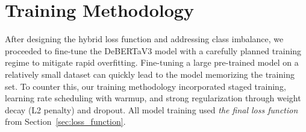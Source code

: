 
\newpage

\section{Training Methodology}\label{sec:training_methodology}

After designing the hybrid loss function and addressing class imbalance, we proceeded to fine-tune the \ac{DeBERTaV3} model with a carefully planned training regime to mitigate rapid overfitting. Fine-tuning a large pre-trained model on a relatively small dataset can quickly lead to the model memorizing the training set. To counter this, our training methodology incorporated staged training, learning rate scheduling with warmup, and strong regularization through weight decay (L2 penalty) and dropout. All model training used \textit{the final loss function} from Section~\ref{sec:loss_function}.


